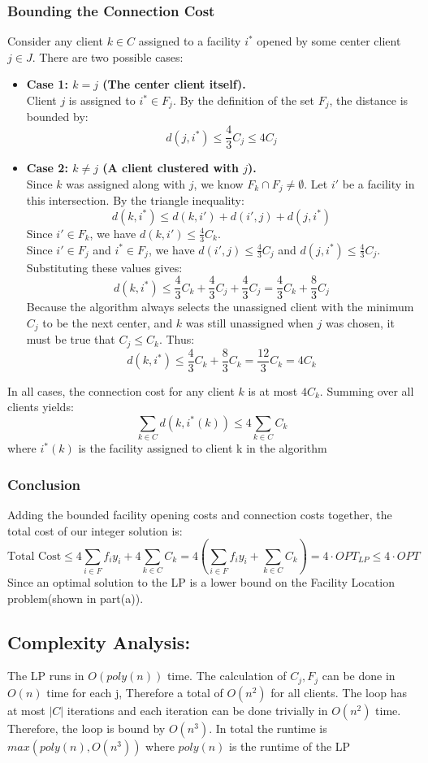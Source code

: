 \subsubsection*{Bounding the Connection Cost}
Consider any client $k \in C$ assigned to a facility $i^*$ opened by some center client $j \in J$. There are two possible cases:
\begin{itemize}
    \item \textbf{Case 1: $k = j$ (The center client itself).} \\
    Client $j$ is assigned to $i^* \in F_j$. By the definition of the set $F_j$, the distance is bounded by:
    \[ d(j, i^*) \le \frac{4}{3} C_j \le 4 C_j \]

    \item \textbf{Case 2: $k \neq j$ (A client clustered with $j$).} \\
    Since $k$ was assigned along with $j$, we know $F_k \cap F_j \neq \emptyset$. Let $i'$ be a facility in this intersection.
    By the triangle inequality:
    \[ d(k, i^*) \le d(k, i') + d(i', j) + d(j, i^*) \]
    Since $i' \in F_k$, we have $d(k, i') \le \frac{4}{3} C_k$. \\
    Since $i' \in F_j$ and $i^* \in F_j$, we have $d(i', j) \le \frac{4}{3} C_j$ and $d(j, i^*) \le \frac{4}{3} C_j$. \\
    Substituting these values gives:
    \[ d(k, i^*) \le \frac{4}{3} C_k + \frac{4}{3} C_j + \frac{4}{3} C_j = \frac{4}{3} C_k + \frac{8}{3} C_j \]
    Because the algorithm always selects the unassigned client with the minimum $C_j$ to be the next center, and $k$ was still unassigned when $j$ was chosen, it must be true that $C_j \le C_k$. Thus:
    \[ d(k, i^*) \le \frac{4}{3} C_k + \frac{8}{3} C_k = \frac{12}{3} C_k = 4 C_k \]
\end{itemize}
In all cases, the connection cost for any client $k$ is at most $4 C_k$. Summing over all clients yields:
\[ \sum_{k \in C} d(k, i^*(k)) \le 4 \sum_{k \in C} C_k \]
where $i^*(k)$ is the facility assigned to client k in the algorithm
\subsubsection*{Conclusion}
Adding the bounded facility opening costs and connection costs together, the total cost of our integer solution is:
\[ \text{Total Cost} \le 4 \sum_{i \in F} f_i y_i + 4 \sum_{k \in C} C_k = 4 \left( \sum_{i \in F} f_i y_i + \sum_{k \in C} C_k \right) = 4 \cdot OPT_{LP}  \le 4\cdot OPT\]
Since an optimal solution to the LP is a lower bound on the Facility Location problem(shown in part(a)).

\subsection*{Complexity Analysis:} The LP runs in $O(poly(n))$ time. The calculation of $C_j, F_j$ can be done in $O(n)$ time for each j, Therefore a total of $O(n^2)$ for all clients. The loop has at most $|C|$ iterations and each iteration can be done trivially in $O(n^2)$ time. Therefore, the loop is bound by $O(n^3)$. In total the runtime is $max(poly(n), O(n^3))$ where $poly(n)$ is the runtime of the LP



